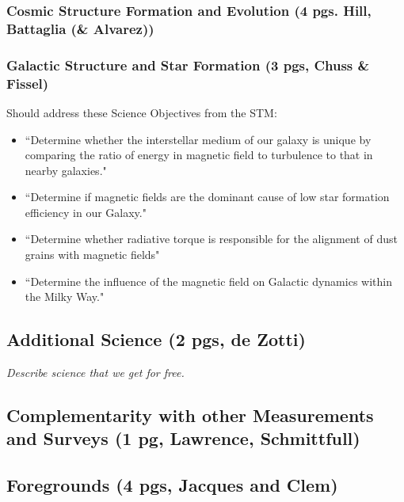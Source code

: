 \documentclass[12pt]{article}
\begin{document}



\subsubsection{Cosmic Structure Formation and Evolution (4 pgs. Hill, Battaglia (\& Alvarez))}



\subsubsection{Galactic Structure and Star Formation (3 pgs, Chuss \& Fissel)}

Should address these Science Objectives from the STM:
        \begin{itemize}
        \item ``Determine whether the interstellar medium of our galaxy is unique by comparing the ratio of energy in magnetic field to turbulence to that in nearby galaxies."
        \item ``Determine if magnetic fields are the dominant cause of low star formation efficiency in our Galaxy."
        \item ``Determine whether radiative torque is responsible for the alignment of dust grains with magnetic fields"
        \item ``Determine the influence of the magnetic field on Galactic dynamics within the Milky Way."
        \end{itemize}



\subsection{Additional Science (2 pgs, de Zotti)} 

{\it Describe science that we get for free. }




\subsection{Complementarity with other Measurements and Surveys (1 pg, Lawrence, Schmittfull)} 




\subsection{Foregrounds (4 pgs, Jacques and Clem)}
\end{document}

